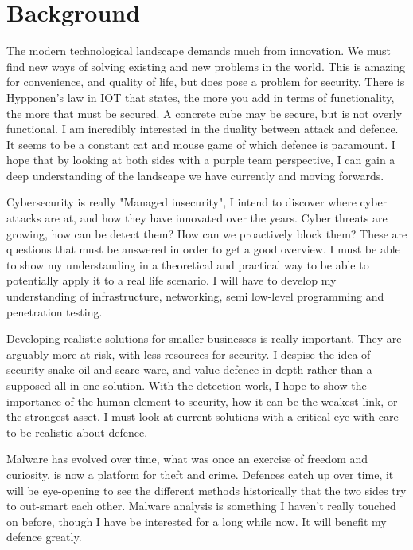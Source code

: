
\section{Background}
The modern technological landscape demands much from innovation. 
We must find new ways of solving existing and new problems in the world. 
This is amazing for convenience, and quality of life, but does pose a problem for security. 
There is Hypponen's  law in IOT that states, the more you add in terms of functionality, the more that must be secured. 
A concrete cube may be secure, but is not overly functional. I am incredibly interested in the duality between attack and defence. 
It seems to be a constant cat and mouse game of which defence is paramount. 
I hope that by looking at both sides with a purple team perspective, I can gain a deep understanding of the landscape we have currently and moving forwards. 

Cybersecurity is really "Managed insecurity", I intend to discover where cyber attacks are at, and how they have innovated over the years.
Cyber threats are growing, how can be detect them? How can we proactively block them? These are questions that must be answered in order to get a good overview.
I must be able to show my understanding in a theoretical and practical way to be able to potentially apply it to a real life scenario. 
I will have to develop my understanding of infrastructure, networking, semi low-level programming and penetration testing.

Developing realistic solutions for smaller businesses is really important. They are arguably more at risk, with less resources for security. 
I despise the idea of security snake-oil and scare-ware, and value defence-in-depth rather than a supposed all-in-one solution.
With the detection work, I hope to show the importance of the human element to security, how it can be the weakest link, or the strongest asset. 
I must look at current solutions with a critical eye with care to be realistic about defence. 

Malware has evolved over time, what was once an exercise of freedom and curiosity, is now a platform for theft and crime. 
Defences catch up over time, it will be eye-opening to see the different methods historically that the two sides try to out-smart each other.
Malware analysis is something I haven't really touched on before, though I have be interested for a long while now. It will benefit my defence greatly.


